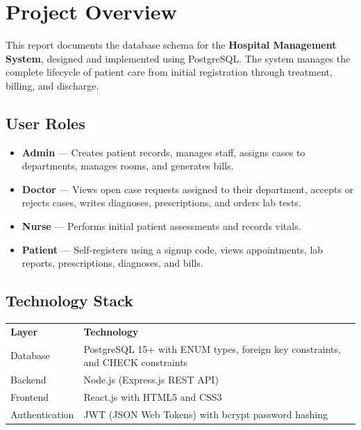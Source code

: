 \documentclass{article}
\newcommand{\theadcell}{\color{white}\bfseries}
\begin{document}
\section{Project Overview}

This report documents the database schema for the \textbf{Hospital Management System}, designed and implemented using PostgreSQL. The system manages the complete lifecycle of patient care from initial registration through treatment, billing, and discharge.

\subsection{User Roles}

\begin{itemize}[leftmargin=1.5cm]
  \item \textbf{Admin} --- Creates patient records, manages staff, assigns cases to departments, manages rooms, and generates bills.
  \item \textbf{Doctor} --- Views open case requests assigned to their department, accepts or rejects cases, writes diagnoses, prescriptions, and orders lab tests.
  \item \textbf{Nurse} --- Performs initial patient assessments and records vitals.
  \item \textbf{Patient} --- Self-registers using a signup code, views appointments, lab reports, prescriptions, diagnoses, and bills.
\end{itemize}

\subsection{Technology Stack}

\begin{center}
\renewcommand{\arraystretch}{1.5}

\begin{tabular}{L{4cm} L{9cm}}
   \theadcell Layer & \theadcell Technology \\
   Database       & PostgreSQL 15+ with ENUM types, foreign key constraints, and CHECK constraints \\
   Backend        & Node.js (Express.js REST API) \\
   Frontend       & React.js with HTML5 and CSS3 \\
   Authentication & JWT (JSON Web Tokens) with bcrypt password hashing \\
\end{tabular}

\end{center}
\end{document}
